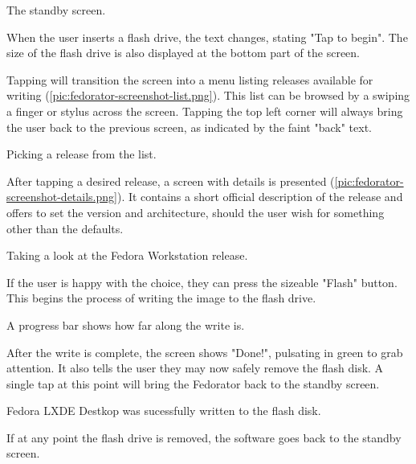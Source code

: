             {The standby screen.}
        
        When the user inserts a flash drive, the text changes, stating "Tap to begin".  The size of the flash drive is also displayed at the bottom part of the screen.
        
        Tapping will transition the screen into a menu listing releases available for writing (\ref{pic:fedorator-screenshot-list.png}).  This list can be browsed by a swiping a finger or stylus across the screen.  Tapping the top left corner will always bring the user back to the previous screen, as indicated by the faint "back" text. 
        
            {Picking a release from the list.}
        
        After tapping a desired release, a screen with details is presented (\ref{pic:fedorator-screenshot-details.png}).  It contains a short official description of the release and offers to set the version and architecture, should the user wish for something other than the defaults.
        
            {Taking a look at the Fedora Workstation release.}
        
        If the user is happy with the choice, they can press the sizeable "Flash" button.  This begins the process of writing the image to the flash drive.
        
        
        A progress bar shows how far along the write is.
        
        After the write is complete, the screen shows "Done!", pulsating in green to grab attention.  It also tells the user they may now safely remove the flash disk.  A single tap at this point will bring the Fedorator back to the standby screen.
        
            {Fedora LXDE Destkop was sucessfully written to the flash disk.}
        
        If at any point the flash drive is removed, the software goes back to the standby screen.
        
